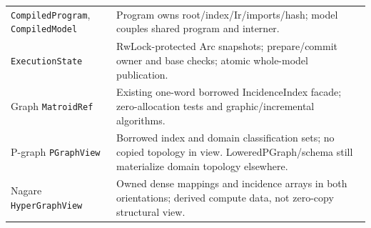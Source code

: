 \documentclass[10pt,a4paper]{article}
\newcommand{\code}[1]{{\small\nolinkurl{#1}}}
\begin{document}
\begin{longtable}{L{37mm}L{129mm}}
\code{CompiledProgram}, \code{CompiledModel} & Program owns root/index/Ir/imports/hash; model couples shared program and interner.\\
\code{ExecutionState} & RwLock-protected Arc snapshots; prepare/commit owner and base checks; atomic whole-model publication.\\
Graph \code{MatroidRef} & Existing one-word borrowed IncidenceIndex facade; zero-allocation tests and graphic/incremental algorithms.\\
P-graph \code{PGraphView} & Borrowed index and domain classification sets; no copied topology in view. LoweredPGraph/schema still materialize domain topology elsewhere.\\
Nagare \code{HyperGraphView} & Owned dense mappings and incidence arrays in both orientations; derived compute data, not zero-copy structural view.\\
\bottomrule
\end{longtable}
\end{document}
